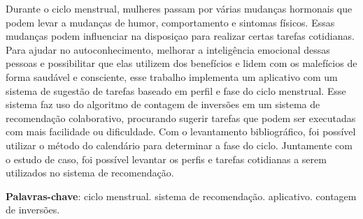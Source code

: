 \begin{resumo}

    Durante o ciclo menstrual, mulheres passam por várias mudanças hormonais que podem levar a 
    mudanças de humor, comportamento e sintomas físicos. Essas mudanças podem influenciar na 
    disposiçao para realizar certas tarefas cotidianas. Para 
    ajudar no autoconhecimento, melhorar a inteligência emocional 
    dessas pessoas e possibilitar que elas utilizem dos benefícios e lidem com os 
    malefícios 
    de forma saudável e consciente, esse trabalho implementa um aplicativo com um sistema de 
    sugestão de tarefas baseado em 
    perfil e fase do ciclo menstrual. Esse sistema faz uso do algoritmo de contagem de inversões
    em um sistema de recomendação colaborativo, procurando sugerir tarefas 
    que podem ser executadas com mais facilidade ou dificuldade. Com o levantamento bibliográfico, 
    foi possível utilizar o método do calendário para determinar a fase do ciclo. Juntamente com o 
    estudo de caso, foi possível levantar os perfis e tarefas cotidianas a serem utilizados no sistema de 
    recomendação.
    
     \vspace{\onelineskip}
        
     \noindent
     \textbf{Palavras-chave}: ciclo menstrual. sistema de recomendação. aplicativo. contagem de inversões.
    \end{resumo}
    